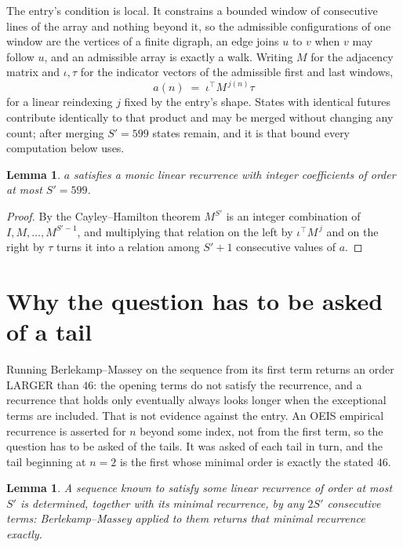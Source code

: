 \documentclass[11pt,a4paper]{article}
\theoremstyle{plain}
\newtheorem{lemma}[theorem]{Lemma}
\theoremstyle{definition}
\begin{document}
The entry's condition is local. It constrains a bounded window of consecutive lines of the
array and nothing beyond it, so the admissible configurations of one window are the vertices of
a finite digraph, an edge joins $u$ to $v$ when $v$ may follow $u$, and an admissible array is
exactly a walk. Writing $M$ for the adjacency matrix and $\iota,\tau$ for the indicator vectors
of the admissible first and last windows,
\[
a(n)\;=\;\iota^{\!\top}M^{\,j(n)}\tau
\]
for a linear reindexing $j$ fixed by the entry's shape. States with identical futures
contribute identically to that product and may be merged without changing any count; after
merging $S'=599$ states remain, and it is that bound every computation below uses.

\begin{lemma}\label{lem:cf}
$a$ satisfies a monic linear recurrence with integer coefficients of order at most $S'=599$.
\end{lemma}

\begin{proof}
By the Cayley--Hamilton theorem $M^{S'}$ is an integer combination of $I,M,\dots,M^{S'-1}$,
and multiplying that relation on the left by $\iota^{\!\top}M^{\,j}$ and on the right by
$\tau$ turns it into a relation among $S'+1$ consecutive values of $a$.
\end{proof}

\section{Why the question has to be asked of a tail}

Running Berlekamp--Massey on the sequence from its first term returns an order LARGER than $46$: the opening terms do not satisfy the recurrence, and a recurrence that holds only eventually always looks longer when the exceptional terms are included. That is not evidence against the entry. An OEIS empirical recurrence is asserted for $n$ beyond some index, not from the first term, so the question has to be asked of the tails. It was asked of each tail in turn, and the tail beginning at $n=2$ is the first whose minimal order is exactly the stated $46$.

\begin{lemma}\label{lem:bm}
A sequence known to satisfy some linear recurrence of order at most $S'$ is determined,
together with its minimal recurrence, by any $2S'$ consecutive terms: Berlekamp--Massey applied
to them returns that minimal recurrence exactly.
\end{lemma}
\end{document}
